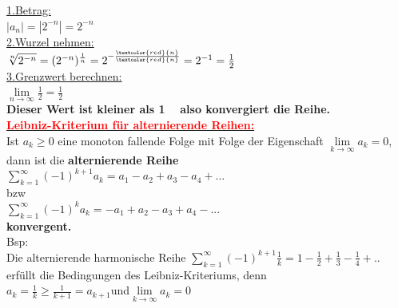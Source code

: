\documentclass[12pt,a4paper]{article}
\begin{document}
\underline{1.Betrag:}\\
$|a_n|=|2^{-n}|=2^{-n}$\\
\underline{2.Wurzel nehmen:}\\
$\sqrt[n]{2^{-n}}=(2^{-n})^\frac{1}{n}=2^{-\frac{\textcolor{red}{n}}{\textcolor{red}{n}}}=2^{-1}=\frac{1}{2}$\\
\underline{3.Grenzwert berechnen:}\\
$\lim\limits_{n\rightarrow\infty}\frac{1}{2}=\frac{1}{2}$\\
\textbf{Dieser Wert ist kleiner als 1 ~ also konvergiert die Reihe.}\\
\underline{\textbf{\textcolor{red}{Leibniz-Kriterium für alternierende Reihen:}}}\\
Ist $a_k\geq 0$ eine monoton fallende Folge mit Folge der Eigenschaft $\lim\limits_{k\rightarrow\infty}a_k=0$, dann ist die \textbf{alternierende Reihe}\\
$\sum\limits_{k=1}^{\infty}(-1)^{k+1}a_k=a_1-a_2+a_3-a_4+...$\\
bzw\\
$\sum\limits_{k=1}^{\infty}(-1)^{k}a_k=-a_1+a_2-a_3+a_4-...$\\
\textbf{konvergent.}\\
Bsp:\\
Die alternierende harmonische Reihe $\sum\limits_{k=1}^{\infty}(-1)^{k+1}\frac{1}{k}=1-\frac{1}{2}+\frac{1}{3}-\frac{1}{4}+..$\\
erfüllt die Bedingungen des Leibniz-Kriteriums, denn\\
$a_k=\frac{1}{k}\geq \frac{1}{k+1}=a_{k+1}$und$\lim\limits_{k\rightarrow\infty}a_k=0$\\
\newpage
\end{document}
